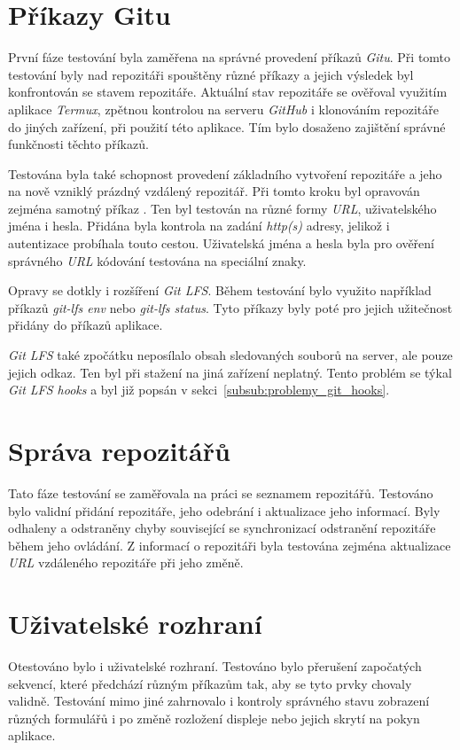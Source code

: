 \section{Příkazy Gitu}
První fáze testování byla zaměřena na správné provedení příkazů \emph{Gitu}. Při tomto testování byly nad repozitáři spouštěny různé příkazy a jejich výsledek byl konfrontován se stavem repozitáře. Aktuální stav repozitáře se ověřoval využitím aplikace \emph{Termux}, zpětnou kontrolou na serveru \emph{GitHub} i klonováním repozitáře do jiných zařízení, při použití této aplikace. Tím bylo dosaženo zajištění správné funkčnosti těchto příkazů.

Testována byla také schopnost provedení základního vytvoření repozitáře a jeho  na nově vzniklý prázdný vzdálený repozitář. Při tomto kroku byl opravován zejména samotný příkaz . Ten byl testován na různé formy \emph{URL}, uživatelského jména i hesla. Přidána byla kontrola na zadání \emph{http(s)} adresy, jelikož i autentizace probíhala touto cestou. Uživatelská jména a hesla byla pro ověření správného \emph{URL} kódování testována na speciální znaky.

Opravy se dotkly i rozšíření \emph{Git LFS}. Během testování bylo využito například příkazů \emph{git-lfs env} nebo \emph{git-lfs status}. Tyto příkazy byly poté pro jejich užitečnost přidány do příkazů aplikace.

\emph{Git LFS} také zpočátku neposílalo obsah sledovaných souborů na server, ale pouze jejich odkaz. Ten byl při stažení na jiná zařízení neplatný. Tento problém se týkal \emph{Git LFS hooks} a byl již popsán v sekci~\ref{subsub:problemy_git_hooks}.

\section{Správa repozitářů}
Tato fáze testování se zaměřovala na práci se seznamem repozitářů. Testováno bylo validní přidání repozitáře, jeho odebrání i aktualizace jeho informací. Byly odhaleny a odstraněny chyby související se synchronizací odstranění repozitáře během jeho ovládání. Z informací o repozitáři byla testována zejména aktualizace \emph{URL} vzdáleného repozitáře při jeho změně.

\newpage
\section{Uživatelské rozhraní}
Otestováno bylo i uživatelské rozhraní. Testováno bylo přerušení započatých sekvencí, které předchází různým příkazům tak, aby se tyto prvky chovaly validně. Testování mimo jiné zahrnovalo i kontroly správného stavu zobrazení různých formulářů i po změně rozložení displeje nebo jejich skrytí na pokyn aplikace.

